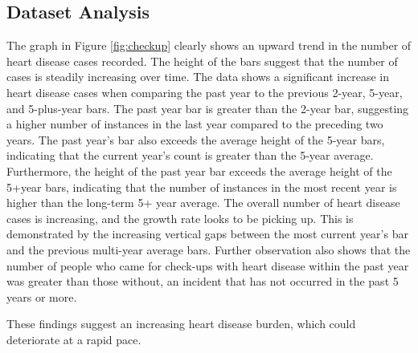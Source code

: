 \documentclass[12pt, a4paper,twoside]{report}
\numberwithin{equation}{chapter}
\begin{document}
\subsection{Dataset Analysis}


The graph in Figure \ref{fig:checkup} clearly shows an upward trend in the number of heart disease cases recorded. The height of the bars suggest that the number of cases is steadily increasing over time.
The data shows a significant increase in heart disease cases when comparing the past year to the previous 2-year, 5-year, and 5-plus-year bars. The past year bar is greater than the 2-year bar, suggesting a higher number of instances in the last year compared to the preceding two years.
The past year's bar also exceeds the average height of the 5-year bars, indicating that the current year's count is greater than the 5-year average.
Furthermore, the height of the past year bar exceeds the average height of the 5+year bars, indicating that the number of instances in the most recent year is higher than the long-term 5+ year average.
The overall number of heart disease cases is increasing, and the growth rate looks to be picking up. This is demonstrated by the increasing vertical gaps between the most current year's bar and the previous multi-year average bars.
Further observation also shows that the number of people who came for check-ups with heart disease within the past year was greater than those without, an incident that has not occurred in the past 5 years or more.

These findings suggest an increasing heart disease burden, which could deteriorate at a rapid pace.

\end{document}
